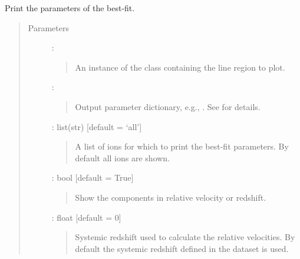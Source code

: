 \documentclass[letterpaper,10pt,english]{sphinxmanual}
\begin{document}
\begin{fulllineitems}
\label{\detokenize{api:output.print_results}}
Print the parameters of the best-fit.
\begin{quote}\begin{description}
\item[{Parameters}] \leavevmode
{} : {\hyperref[\detokenize{api:VoigtFit.DataSet}]{}}
\begin{quote}

An instance of the {\hyperref[\detokenize{api:VoigtFit.DataSet}]{}} class containing
the line region to plot.
\end{quote}

 : 
\begin{quote}

Output parameter dictionary, e.g., .
See  for details.
\end{quote}

 : list(str)   {[}default = ‘all’{]}
\begin{quote}

A list of ions for which to print the best-fit parameters.
By default all ions are shown.
\end{quote}

 : bool   {[}default = True{]}
\begin{quote}

Show the components in relative velocity or redshift.
\end{quote}

 : float   {[}default = 0{]}
\begin{quote}

Systemic redshift used to calculate the relative velocities.
By default the systemic redshift defined in the dataset is used.
\end{quote}


\end{description}\end{quote}

\end{fulllineitems}
\end{document}
